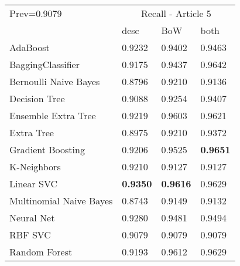 \begin{tabular}{|l|l|l|l| }
\hline
Prev=0.9079 &  \multicolumn{3}{c|}{Recall - Article 5} \\
\cline{2-4} & desc & BoW & both \\ \hline
AdaBoost                & 0.9232 & 0.9402 & 0.9463\\
BaggingClassifier       & 0.9175 & 0.9437 & 0.9642\\
Bernoulli Naive Bayes   & 0.8796 & 0.9210 & 0.9136\\
Decision Tree           & 0.9088 & 0.9254 & 0.9407\\
Ensemble Extra Tree     & 0.9219 & 0.9603 & 0.9621\\
Extra Tree              & 0.8975 & 0.9210 & 0.9372\\
Gradient Boosting       & 0.9206 & 0.9525 & {\bf 0.9651}\\
K-Neighbors             & 0.9210 & 0.9127 & 0.9127\\
Linear SVC              & {\bf 0.9350} & {\bf 0.9616} & 0.9629\\
Multinomial Naive Bayes & 0.8743 & 0.9149 & 0.9132\\
Neural Net              & 0.9280 & 0.9481 & 0.9494\\
RBF SVC                 & 0.9079 & 0.9079 & 0.9079\\
Random Forest           & 0.9193 & 0.9612 & 0.9629\\
\hline
\end{tabular}